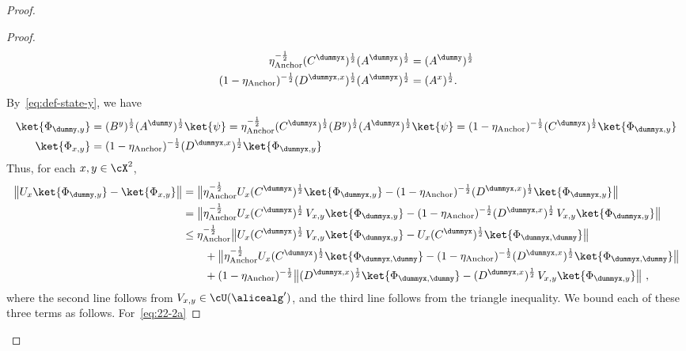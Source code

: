 \begin{proof}
\begin{proof}
\begin{align*}
		\eta_{\text{Anchor}}^{-\frac{1}{2}} (C^{\dummyx})^{\frac{1}{2}}  (A^{\dummyx})^{\frac{1}{2}}&= (A^{\dummy})^{\frac{1}{2}} \\
		(1-\eta_{\text{Anchor}})^{-\frac{1}{2}}  (D^{\dummyx, x})^{\frac{1}{2}} (A^{\dummyx})^{\frac{1}{2}} &= (A^{x})^{\frac{1}{2}}.
		\end{align*}
		By~\eqref{eq:def-state-y}, we have 
		\begin{align*}
			\ket{\Phi_{\dummy,y}} &= (B^y)^{\frac{1}{2}} (A^{\dummy})^{\frac{1}{2}}  \ket{\psi} =  	\eta_{\text{Anchor}}^{-\frac{1}{2}}   (C^{\dummyx})^{\frac{1}{2}} (B^y)^{\frac{1}{2}}  (A^{\dummyx})^{\frac{1}{2}}  \ket{\psi} = 	(1-\eta_{\text{Anchor}})^{-\frac{1}{2}}   (C^{\dummyx})^{\frac{1}{2}}   \ket{\Phi_{\dummyx,y}} \\
			\ket{\Phi_{x,y}} &=		(1-\eta_{\text{Anchor}})^{-\frac{1}{2}}     (D^{\dummyx, x})^{\frac{1}{2}}   \ket{\Phi_{\dummyx,y}} 
		\end{align*}
	 	Thus, for each $x, y \in \cX^2$,
		\begin{align}
			\left \| U_x \ket{\Phi_{\dummy,y}} - \ket{\Phi_{x,y}} \right \| &=   \big \| \eta_{\text{Anchor}}^{-\frac{1}{2}} U_x  (C^{\dummyx})^{\frac{1}{2}} \ket{\Phi_{\dummyx,y}} -	(1-\eta_{\text{Anchor}})^{-\frac{1}{2}} (D^{\dummyx, x})^{\frac{1}{2}}   \ket{\Phi_{\dummyx,y}} \big \| \notag \\
			&=   \big \|  \eta_{\text{Anchor}}^{-\frac{1}{2}} U_x  (C^{\dummyx})^{\frac{1}{2}}  \, V_{x,y} \ket{\Phi_{\dummyx,y}} - 	(1-\eta_{\text{Anchor}})^{-\frac{1}{2}} (D^{\dummyx, x})^{\frac{1}{2}}    \, V_{x,y} \ket{\Phi_{\dummyx,y}} \big \| \notag \\
			&\leq \eta_{\text{Anchor}}^{-\frac{1}{2}} \big \|  U_x  (C^{\dummyx})^{\frac{1}{2}}  \, V_{x,y} \ket{\Phi_{\dummyx,y}} -  U_x  (C^{\dummyx})^{\frac{1}{2}} \ket{\Phi_{\dummyx, \dummy}} \big \|  \label{eq:22-2a}\\
			& \qquad +   \big \|  \eta_{\text{Anchor}}^{-\frac{1}{2}} U_x  (C^{\dummyx})^{\frac{1}{2}} \ket{\Phi_{\dummyx,\dummy}} - 	(1-\eta_{\text{Anchor}})^{-\frac{1}{2}} (D^{\dummyx, x})^{\frac{1}{2}}     \ket{\Phi_{\dummyx,\dummy}} \big \| \label{eq:22-2b}\\
			& \qquad + 	(1-\eta_{\text{Anchor}})^{-\frac{1}{2}} \big \| (D^{\dummyx, x})^{\frac{1}{2}}  \ket{\Phi_{\dummyx,\dummy}} - (D^{\dummyx, x})^{\frac{1}{2}}   \, V_{x,y} \ket{\Phi_{\dummyx,y}} \big \|~,\label{eq:22-2c}
		\end{align}
		where the second line follows from $V_{x,y} \in \cU(\alicealg')$, and the third line follows from the triangle inequality. We bound each of these three terms as follows. For~\eqref{eq:22-2a}

\end{proof}
\end{proof}
